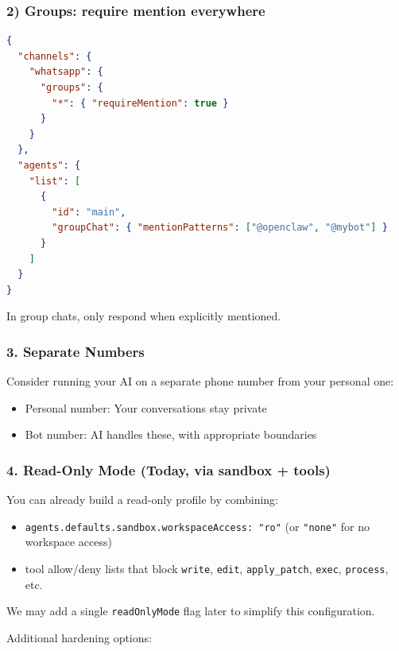 \subsubsection{2) Groups: require mention everywhere}


\begin{lstlisting}[language=json]
{
  "channels": {
    "whatsapp": {
      "groups": {
        "*": { "requireMention": true }
      }
    }
  },
  "agents": {
    "list": [
      {
        "id": "main",
        "groupChat": { "mentionPatterns": ["@openclaw", "@mybot"] }
      }
    ]
  }
}
\end{lstlisting}


In group chats, only respond when explicitly mentioned.

\subsubsection{3. Separate Numbers}


Consider running your AI on a separate phone number from your personal one:

\begin{itemize}
  \item Personal number: Your conversations stay private
  \item Bot number: AI handles these, with appropriate boundaries
\end{itemize}


\subsubsection{4. Read-Only Mode (Today, via sandbox + tools)}


You can already build a read-only profile by combining:

\begin{itemize}
  \item \texttt{agents.defaults.sandbox.workspaceAccess: "ro"} (or \texttt{"none"} for no workspace access)
  \item tool allow/deny lists that block \texttt{write}, \texttt{edit}, \texttt{apply\_patch}, \texttt{exec}, \texttt{process}, etc.
\end{itemize}


We may add a single \texttt{readOnlyMode} flag later to simplify this configuration.

Additional hardening options:

